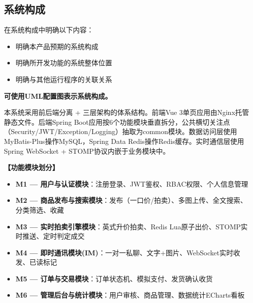 \documentclass[12pt,a4paper]{ctexart}
\numberwithin{figure}{section}
\numberwithin{table}{section}
\begin{document}
\subsection{系统构成}

在系统构成中明确以下内容：

\begin{itemize}
    \item 明确本产品预期的系统构成
    \item 明确所开发功能的系统整体位置
    \item 明确与其他运行程序的关联关系
\end{itemize}

\textbf{可使用UML配置图表示系统构成。}

本系统采用前后端分离 + 三层架构的体系结构。前端Vue 3单页应用由Nginx托管静态文件。后端Spring Boot应用按6个功能模块垂直拆分，公共横切关注点（Security/JWT/Exception/Logging）抽取为common模块。数据访问层使用MyBatis-Plus操作MySQL，Spring Data Redis操作Redis缓存。实时通信层使用Spring WebSocket + STOMP协议内嵌于业务模块中。

\textbf{【功能模块划分】}

\begin{itemize}
    \item \textbf{M1 --- 用户与认证模块}：注册登录、JWT鉴权、RBAC权限、个人信息管理
    \item \textbf{M2 --- 商品发布与搜索模块}：发布（一口价/拍卖）、多图上传、全文搜索、分类筛选、收藏
    \item \textbf{M3 --- 实时拍卖引擎模块}：英式升价拍卖、Redis Lua原子出价、STOMP实时推送、定时判定成交
    \item \textbf{M4 --- 即时通讯模块(IM)}：一对一私聊、文字+图片、WebSocket实时收发、已读标记
    \item \textbf{M5 --- 订单与交易模块}：订单状态机、模拟支付、发货确认收货
    \item \textbf{M6 --- 管理后台与统计模块}：用户审核、商品管理、数据统计ECharts看板
\end{itemize}
\end{document}
